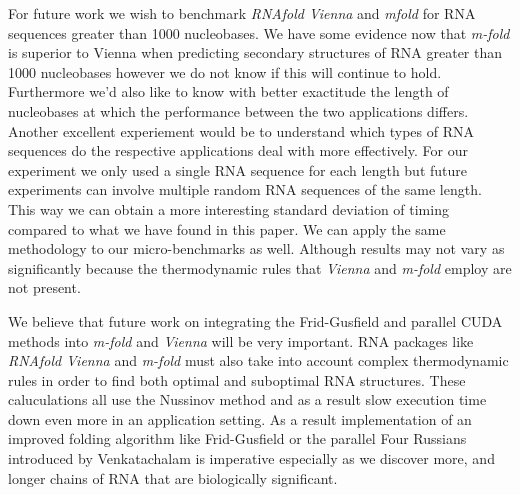 \documentclass[12pt]{article}
\begin{document}
\par For future work we wish to benchmark \textit{RNAfold Vienna} and \textit{mfold} for RNA sequences
greater than 1000 nucleobases. We have some evidence now that \textit{m-fold} is superior to Vienna when
predicting secondary structures of RNA greater than 1000 nucleobases however we do not know if this will
continue to hold. Furthermore we'd also like to know with better exactitude the length of nucleobases at which
the performance between the two applications differs. Another excellent experiement would be to understand which
types of RNA sequences do the respective applications deal with more effectively. For our experiment we only
used a single RNA sequence for each length but future experiments can involve multiple random RNA sequences
of the same length. This way we can obtain a more interesting standard deviation of timing compared to what
we have found in this paper. We can apply the same methodology to our micro-benchmarks as well. Although results may not vary as significantly because the thermodynamic rules that \textit{Vienna} and \textit{m-fold}
employ are not present.

\par We believe that future work on integrating the Frid-Gusfield and parallel CUDA methods into \textit{m-fold} and \textit{Vienna} will be very important. RNA packages like \textit{RNAfold Vienna} and \textit{m-fold} must also
take into account complex thermodynamic rules in order to find both optimal and suboptimal RNA structures. These
caluculations all use the Nussinov method and as a result slow execution time down even more in an
application setting. As a result implementation of an improved folding algorithm like Frid-Gusfield
or the parallel Four Russians introduced by Venkatachalam is imperative especially as we discover more,
and longer chains of RNA that are biologically significant.
\end{document}
